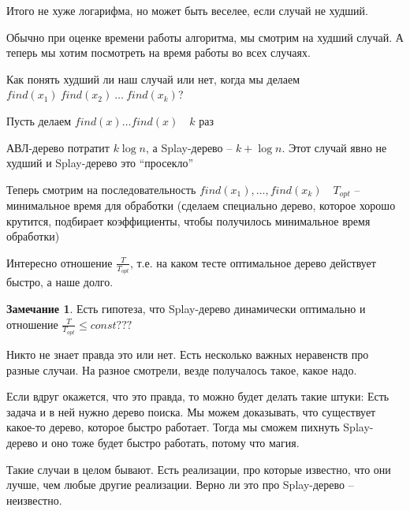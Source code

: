 \documentclass{book}
\theoremstyle{definition}
\newtheorem*{note}{Замечание}
\begin{document}
Итого не хуже логарифма, но может быть веселее, если случай не худший.

Обычно при оценке времени работы алгоритма, мы смотрим на худший случай. А теперь мы хотим посмотреть на время работы во всех случаях.

Как понять худший ли наш случай или нет, когда мы делаем $find(x_1)\ find(x_2)\ \ldots \ find(x_{k} )$?

Пусть делаем $find(x) \ldots find(x)\quad k$ раз

АВЛ-дерево потратит $k\log n$, а Splay-дерево -- $k + \log n$. Этот случай явно не худший и Splay-дерево это ``просекло''

Теперь смотрим на последовательность $find(x_1), \ldots, find(x_k)\quad T_{opt}$ -- минимальное время для обработки (сделаем специально дерево, которое хорошо крутится, подбирает коэффициенты, чтобы получилось минимальное время обработки)

Интересно отношение $\frac{T}{T_{opt}}$, т.е. на каком тесте оптимальное дерево действует быстро, а наше долго.

\begin{note}
    Есть гипотеза, что Splay-дерево динамически оптимально и отношение $\frac{T}{T_{opt}} \leqslant const???$ 

    Никто не знает правда это или нет. Есть несколько важных неравенств про разные случаи. На разное смотрели, везде получалось такое, какое надо.

    Если вдруг окажется, что это правда, то можно будет делать такие штуки:
    Есть задача и в ней нужно дерево поиска. Мы можем доказывать, что существует какое-то дерево, которое быстро работает. Тогда мы сможем пихнуть Splay-дерево и оно тоже будет быстро работать, потому что магия.

    Такие случаи в целом бывают. Есть реализации, про которые известно, что они лучше, чем любые другие реализации. Верно ли это про Splay-дерево -- неизвестно.
\end{note}
\end{document}
